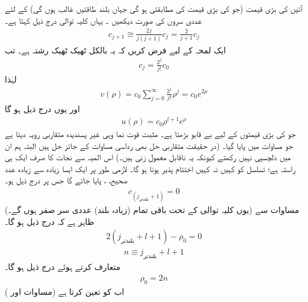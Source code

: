  آئیں  کی بڑی قیمت (جو   کی بڑی قیمت کی مطابقتی ہو گی  جہاں بلند طاقتیں غالب ہوں گی) کے لئے عددی سروں کی صورت دیکھیں ۔ یہاں  کلیہ توالی درج ذیل کہتا ہے۔
\begin{align*}
c_{j+1}\cong\frac{2j}{j(j+1)}c_{j}=\frac{2}{j+1}c_{j} 
\end{align*}
ایک لمحہ کے لیے فرض کریں  کہ یہ بالکل ٹھیک ٹھیک رشتہ ہے۔ تب 
\begin{align}
c_{j}=\frac{2^{j}}{j!}c_{0} 
\end{align}
لہٰذا
\begin{align*}
v(\rho)=c_{0}\sum_{j=0}^{\infty}\frac{2^{j}}{j!}\rho^{j}=c_{0}e^{2\rho} 
\end{align*}
 اور یوں  درج ذیل ہو گا
\begin{align}
u(\rho)=c_{0}\rho^{l+1}e^{\rho} 
\end{align}
 جو     کی بڑی قیمتوں کے لیے  بے قابو بڑھتا ہے۔ مثبت قوت نما وہی غیر پسندیدہ متقاربی رویہ دیتا ہے جو مساوات  میں پایا گیا۔ (در حقیقت  متقاربی حل بھی رداسی مساوات کے جائز حل ہیں البتہ ہم ان میں دلچسپی نہیں رکھتے  کیونکہ یہ ناقابل  معمول زنی   ہیں۔) اس المیہ سے نجات کا صرف ایک ہی راستہ ہے؛ تسلسل کو کہیں نہ کہیں اختتام پذیر ہونا ہو گا۔ لازمی طور پر ایک ایسا زیادہ سے زیادہ عدد صحیح، ، پایا جائے گا جس پر درج ذیل ہو۔
 \begin{align}
c_{(j_{\text{بلندتر}}+1)}=0
\end{align}
 (یوں کلیہ توالی کے تحت باقی تمام (زیادہ بلند) عددی سر صفر ہوں گے۔)  مساوات  سے ظاہر ہے کہ درج ذیل ہو گا۔
 \begin{align*}
2(j_{\text{بلندتر}}+l+1)-\rho_{0}=0 
\end{align*}
 \begin{align}\label{مساوات_ابعادی_صدر_کوانٹائی_عدد}
n\equiv j_{\text{بلندتر}}+l+1 
\end{align}
 متعارف کرتے ہوئے درج ذیل ہو گا۔
 \begin{align}\label{مساوات_ابعادی_رو_این}
\rho_{0}=2n 
\end{align}
 اب  کو    تعین کرتا ہے (مساوات  اور )
